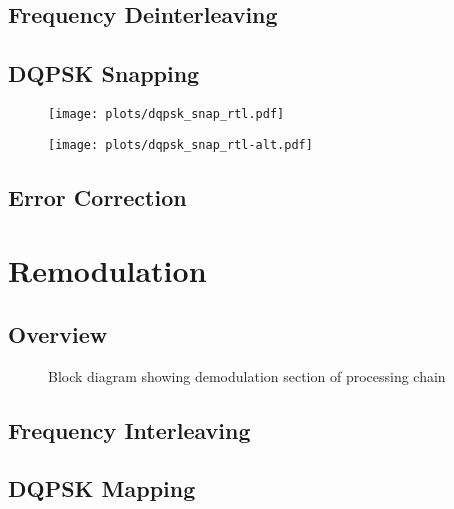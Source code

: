 \documentclass[class=report,11pt,crop=false]{standalone}
\begin{document}
\subsection{Frequency Deinterleaving \label{subsect:dab-proc_freq-deinterleave}}

\subsection{DQPSK Snapping \label{subsect:dab-proc_dqpsk-snap}}

\begin{figure}[htbp]
  \centering
  \captionsetup{type=figure}
  \texttt{[image: plots/dqpsk\_snap\_rtl.pdf]}
  \caption{}
  \label{fig:dqpsk_snap_rtl}
\end{figure}

\begin{figure}[htbp]
  \centering
  \captionsetup{type=figure}
  \texttt{[image: plots/dqpsk\_snap\_rtl-alt.pdf]}
  \caption{}
  \label{fig:dqpsk_snap_rtl-alt}
\end{figure}

\subsection{Error Correction \label{subsect:dab-proc_error-correct}}

\section{Remodulation \label{sect:dab-proc_remodulate}}

\subsection{Overview}

\begin{figure}[htbp]
    \centering
    \captionsetup{type=figure}
    \def\svgwidth{\linewidth}
    { %
        }
    \caption{Block diagram showing demodulation section of processing chain}
    \label{fig:BD_Remod_All}
\end{figure}

\subsection{Frequency Interleaving \label{subsect:dab-proc_freq-interleave}}
\subsection{DQPSK Mapping \label{subsect:dab-proc_dqpsk-map}}
\end{document}
